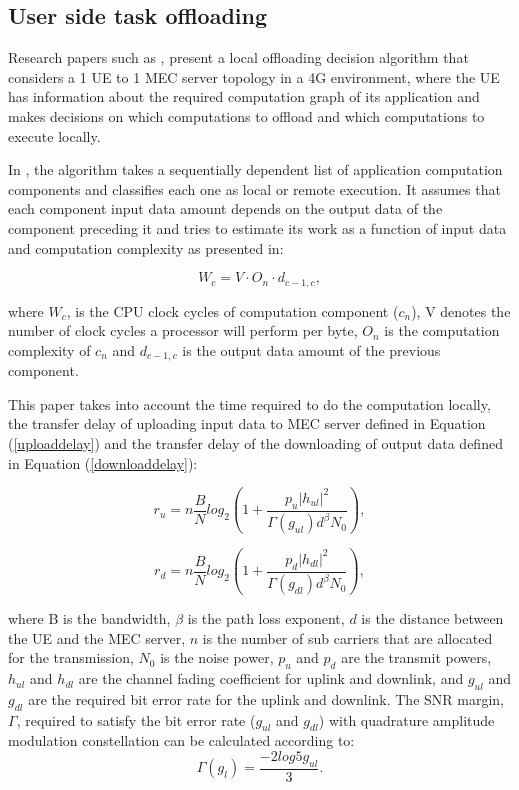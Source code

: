 \subsection{User side task offloading}
\noindent Research papers such as \cite{taskclass1}, \cite{taskclass2} present a local offloading decision algorithm that considers a 1 \acrshort{UE} to 1 \acrshort{MEC} server topology in a 4G environment, where the \acrshort{UE} has information about the required computation graph of its application and makes decisions on which computations to offload and which computations to execute locally. 

In \cite{taskclass1}, the algorithm takes a sequentially dependent list of application computation components  and classifies each one as local or remote execution. It assumes that each component input data amount depends on the output data of the component preceding it and tries to estimate its work as a function of input data and computation complexity as presented in:

\begin{equation} 
    W_c = V \cdot O_n \cdot d_{c-1, c}, 
\end{equation}\label{wcv}

where $W_c$, is the \acrshort{CPU} clock cycles of computation component ($c_n$), V denotes the number of clock cycles a processor will perform per byte, $O_n$ is the computation complexity of $c_n$ and $d_{c-1,c}$ is the output data amount of the previous component.

This paper takes into account the time required to do the computation locally, the transfer delay of uploading input data to \acrshort{MEC} server defined in Equation (\ref{uploaddelay}) and the transfer delay of the downloading of output data defined in Equation (\ref{downloaddelay}):

\begin{equation}\label{uploaddelay}
r_u = n \frac{B}{N} log_2(1+\frac{p_u|h_{ul}|^2}{\Gamma(g_{ul})d^\beta N_0}),
\end{equation}

\begin{equation}\label{downloaddelay}
r_d = n \frac{B}{N} log_2(1+\frac{p_d|h_{dl}|^2}{\Gamma(g_{dl})d^\beta N_0}),
\end{equation}

where B is the bandwidth, $\beta$ is the path loss exponent, $d$ is the distance between the \acrshort{UE} and the \acrshort{MEC} server, $n$ is the number of sub carriers that are allocated for the transmission, $N_0$ is the noise power, $p_u$ and $p_d$ are the transmit powers, $h_{ul}$ and $h_{dl}$ are the channel fading coefficient for uplink and downlink, and $g_{ul}$ and $g_{dl}$ are the required bit error rate for the uplink and downlink. The SNR margin, $\Gamma$, required to satisfy the bit error rate ($g_{ul}$ and $g_{dl}$) with quadrature amplitude modulation constellation can be calculated according to:
\begin{equation} \label{SNR}
    \Gamma(g_{l}) = \frac{-2log5g_{ul}}{3} .
\end{equation}

